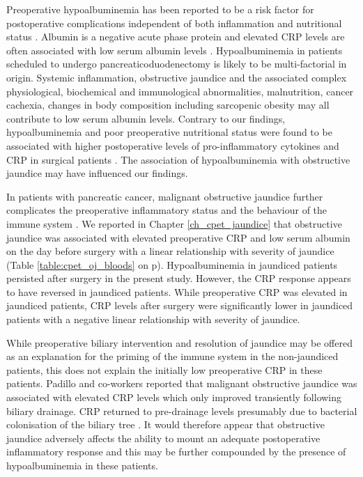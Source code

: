 Preoperative hypoalbuminemia has been reported to be a risk factor for postoperative complications independent of both inflammation and nutritional status \parencite{gibbs_preoperative_1999, don_poor_2004, hennessey_preoperative_2010}.
Albumin is a negative acute phase protein and elevated CRP levels are often associated with low serum albumin levels \parencite{margarson_serum_1998}. 
Hypoalbuminemia in patients scheduled to undergo pancreaticoduodenectomy is likely to be multi-factorial in origin. 
Systemic inflammation, obstructive jaundice and the associated complex physiological, biochemical and immunological abnormalities, malnutrition, cancer cachexia, changes in body composition including sarcopenic obesity may all contribute to low serum albumin levels. 
Contrary to our findings, hypoalbuminemia and poor preoperative nutritional status were found to be associated with higher postoperative levels of pro-inflammatory cytokines and CRP in surgical patients \parencite{nakamura_influence_1999}.
The association of hypoalbuminemia with obstructive jaundice may have influenced our findings. 

In patients with pancreatic cancer, malignant obstructive jaundice further complicates the preoperative inflammatory status and the behaviour of the immune system \parencite{nehez_compromise_2002}. 
We reported in Chapter \ref{ch_cpet_jaundice} that obstructive jaundice was associated with elevated preoperative CRP and low serum albumin on the day before surgery with a linear relationship with severity of jaundice (Table \ref{table:cpet_oj_bloods} on p\pageref{table:cpet_oj_bloods}).
Hypoalbuminemia in jaundiced patients persisted after surgery in the present study.
However, the CRP response appears to have reversed in jaundiced patients.
While preoperative CRP was elevated in jaundiced patients, CRP levels after surgery were significantly lower in jaundiced patients with a negative linear relationship with severity of jaundice.

While preoperative biliary intervention and resolution of jaundice may be offered as an explanation for the priming of the immune system in the non-jaundiced patients, this does not explain the initially low preoperative CRP in these patients.
Padillo and co-workers reported that malignant obstructive jaundice was associated with elevated CRP levels which only improved transiently following biliary drainage.
CRP returned to pre-drainage levels presumably due to bacterial colonisation of the biliary tree  \parencite{padillo_effect_2002, padillo_cytokines_2001}.
It would therefore appear that obstructive jaundice adversely affects the ability to mount an adequate postoperative inflammatory response and this may be further compounded by the presence of hypoalbuminemia in these patients.

